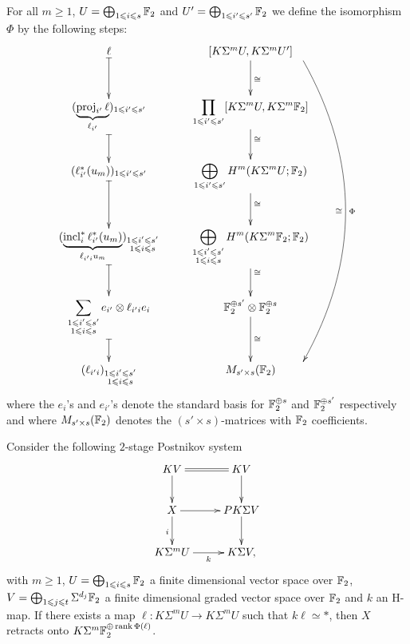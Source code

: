 \begin{defn}
For all $m\geq1$, $U=\bigoplus_{1\leqslant i\leqslant s}\mathbb{F}_2$ and $U'=\bigoplus_{1\leqslant i'\leqslant s'}\mathbb{F}_2$ we define the isomorphism $\Phi$ by the following steps:
$$\xymatrix{
\ell\ar@{|->}[d] &[K\Sigma^m U,K\Sigma^m U']\ar[d]^\cong\ar@<1.5cm>@/^1.5cm/[ddddd]_\cong^\Phi\\
(\underbrace{\proj_{i'} \ell}_{\ell_{i'}})_{1\leq {i'}\leq s'}\ar@{|->}[d] &\displaystyle\prod_{1\leq {i'}\leq s'}[K\Sigma^m U,K\Sigma^m \F_2]\ar[d]^\cong\\
(\ell_{i'}^*(u_m))_{1\leq {i'}\leq s'}\ar@{|->}[d] &\displaystyle\bigoplus_{1\leq {i'}\leq s'}H^m(K\Sigma^m U;\F_2)\ar[d]^\cong\\
(\underbrace{\incl_i^*\ell_{i'}^*(u_m)}_{\ell_{{i'}i}u_m})_{\substack{1\leq {i'}\leq s'\\ 1\leq i\leq s}}\ar@{|->}[d] &\displaystyle\bigoplus_{\substack{1\leq {i'}\leq s'\\ 1\leq i\leq s}}H^m(K\Sigma^m \F_2;\F_2)\ar[d]^\cong\\
\displaystyle\sum_{\substack{1\leq {i'}\leq s'\\ 1\leq i\leq s}}e_{i'}\otimes \ell_{{i'}i}e_i\ar@{|->}[d] &\F_2^{\oplus s'}\otimes\F_2^{\oplus s}\ar[d]^\cong\\
(\ell_{{i'}i})_{\substack{1\leq {i'}\leq s'\\ 1\leq i\leq s}} &M_{s'\times s}(\F_2)
}$$ where the $e_i$'s and $e_{i'}$'s denote the standard basis for $\mathbb{F}_2^{\oplus s}$ and $\mathbb{F}_2^{\oplus s'}$ respectively and where $M_{s'\times s}(\mathbb{F}_2)$ denotes the $(s'\times s)$-matrices with $\mathbb{F}_2$ coefficients.
\end{defn}

\begin{lem}\label{l:then retracts}
Consider the following $2$-stage Postnikov system 
$$\xymatrix{
KV\ar[d]\ar@{=}[r] &KV\ar[d]\\
X\ar[r]\ar[d]_i &PK\Sigma V\ar[d]\\
K\Sigma^mU\ar[r]_-k &K\Sigma V,
}$$ with $m\geq1$, $U=\bigoplus_{1\leqslant i\leqslant s}\mathbb{F}_2$ a finite dimensional vector space over $\mathbb{F}_2$, $V=\bigoplus_{1\leqslant j\leqslant t}\Sigma^{d_j}\mathbb{F}_2$ a finite dimensional graded vector space over $\mathbb{F}_2$ and $k$ an H-map. If there exists a map $\ell:K\Sigma^m U\to K\Sigma^m U$ such that $k\ell\simeq *$, then $X$ retracts onto $K\Sigma^m\mathbb{F}_2^{\oplus\operatorname{rank}\Phi(\ell)}$.
\end{lem}

